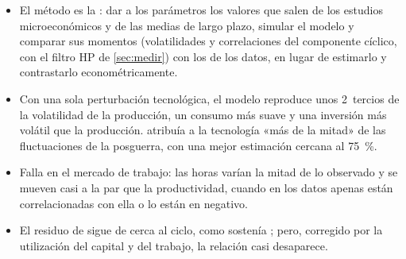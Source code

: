 \documentclass[11pt]{article}
\begin{document}
\begin{itemize}
\item El método es la \nocite{KydlandPrescott1982Time,Prescott1986}: dar a los parámetros los valores que salen de los estudios microeconómicos y de las medias de largo plazo, simular el modelo y comparar sus momentos (volatilidades y correlaciones del componente cíclico, con el filtro HP de \ref{sec:medir}) con los de los datos, en lugar de estimarlo y contrastarlo econométricamente.
\item Con una sola perturbación tecnológica, el modelo reproduce unos 2~tercios de la volatilidad de la producción, un consumo más suave y una inversión más volátil que la producción.  atribuía a la tecnología «más de la mitad» de las fluctuaciones de la posguerra, con una mejor estimación cercana al 75~\%\nocite{Prescott1986Response}.
\item Falla en el mercado de trabajo: las horas varían la mitad de lo observado y se mueven casi a la par que la productividad, cuando en los datos apenas están correlacionadas con ella o lo están en negativo.
\item El residuo de  sigue de cerca al ciclo, como sostenía ; pero, corregido por la utilización del capital y del trabajo, la relación casi desaparece\nocite{BasuFernaldKimball2006Are}.
\end{itemize}
\end{document}
